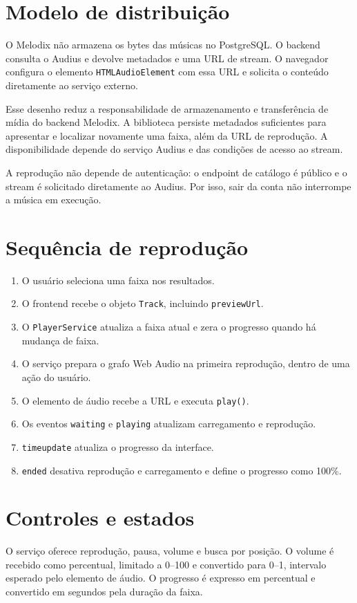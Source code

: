 \documentclass[12pt,a4paper,oneside]{report}
\begin{document}
\section{Modelo de distribuição}
O Melodix não armazena os bytes das músicas no PostgreSQL. O backend consulta o Audius e devolve metadados e uma URL de stream. O navegador configura o elemento \texttt{HTMLAudioElement} com essa URL e solicita o conteúdo diretamente ao serviço externo.

Esse desenho reduz a responsabilidade de armazenamento e transferência de mídia do backend Melodix. A biblioteca persiste metadados suficientes para apresentar e localizar novamente uma faixa, além da URL de reprodução. A disponibilidade depende do serviço Audius e das condições de acesso ao stream.

A reprodução não depende de autenticação: o endpoint de catálogo é público e o stream é solicitado diretamente ao Audius. Por isso, sair da conta não interrompe a música em execução.

\section{Sequência de reprodução}
\begin{enumerate}
\item O usuário seleciona uma faixa nos resultados.
\item O frontend recebe o objeto \texttt{Track}, incluindo \texttt{previewUrl}.
\item O \texttt{PlayerService} atualiza a faixa atual e zera o progresso quando há mudança de faixa.
\item O serviço prepara o grafo Web Audio na primeira reprodução, dentro de uma ação do usuário.
\item O elemento de áudio recebe a URL e executa \texttt{play()}.
\item Os eventos \texttt{waiting} e \texttt{playing} atualizam carregamento e reprodução.
\item \texttt{timeupdate} atualiza o progresso da interface.
\item \texttt{ended} desativa reprodução e carregamento e define o progresso como 100\%.
\end{enumerate}

\section{Controles e estados}
O serviço oferece reprodução, pausa, volume e busca por posição. O volume é recebido como percentual, limitado a 0--100 e convertido para 0--1, intervalo esperado pelo elemento de áudio. O progresso é expresso em percentual e convertido em segundos pela duração da faixa.
\end{document}
